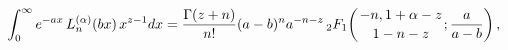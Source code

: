 \[\int_{0}^{\infty}e^{-ax}\mathop{L^{(\alpha)}_{n}\/}\nolimits\!\left(bx\right)x%
^{z-1}dx=\frac{\mathop{\Gamma\/}\nolimits\!\left(z+n\right)}{n!}\*{(a-b)^{n}}a%
^{-n-z}\*\mathop{{{}_{2}F_{1}}\/}\nolimits\!\left({-n,1+\alpha-z\atop 1-n-z};%
\frac{a}{a-b}\right),\]
